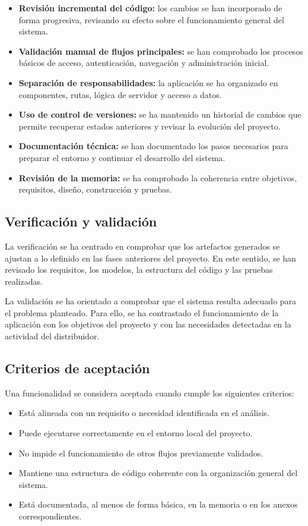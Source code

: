 \begin{itemize}
    \item \textbf{Revisión incremental del código:} los cambios se han incorporado de forma progresiva, revisando su efecto sobre el funcionamiento general del sistema.
    \item \textbf{Validación manual de flujos principales:} se han comprobado los procesos básicos de acceso, autenticación, navegación y administración inicial.
    \item \textbf{Separación de responsabilidades:} la aplicación se ha organizado en componentes, rutas, lógica de servidor y acceso a datos.
    \item \textbf{Uso de control de versiones:} se ha mantenido un historial de cambios que permite recuperar estados anteriores y revisar la evolución del proyecto.
    \item \textbf{Documentación técnica:} se han documentado los pasos necesarios para preparar el entorno y continuar el desarrollo del sistema.
    \item \textbf{Revisión de la memoria:} se ha comprobado la coherencia entre objetivos, requisitos, diseño, construcción y pruebas.
\end{itemize}

\subsection{Verificación y validación}

La verificación se ha centrado en comprobar que los artefactos generados se ajustan a lo definido en las fases anteriores del proyecto. En este sentido, se han revisado los requisitos, los modelos, la estructura del código y las pruebas realizadas.

La validación se ha orientado a comprobar que el sistema resulta adecuado para el problema planteado. Para ello, se ha contrastado el funcionamiento de la aplicación con los objetivos del proyecto y con las necesidades detectadas en la actividad del distribuidor.

\subsection{Criterios de aceptación}

Una funcionalidad se considera aceptada cuando cumple los siguientes criterios:

\begin{itemize}
    \item Está alineada con un requisito o necesidad identificada en el análisis.
    \item Puede ejecutarse correctamente en el entorno local del proyecto.
    \item No impide el funcionamiento de otros flujos previamente validados.
    \item Mantiene una estructura de código coherente con la organización general del sistema.
    \item Está documentada, al menos de forma básica, en la memoria o en los anexos correspondientes.
\end{itemize}

